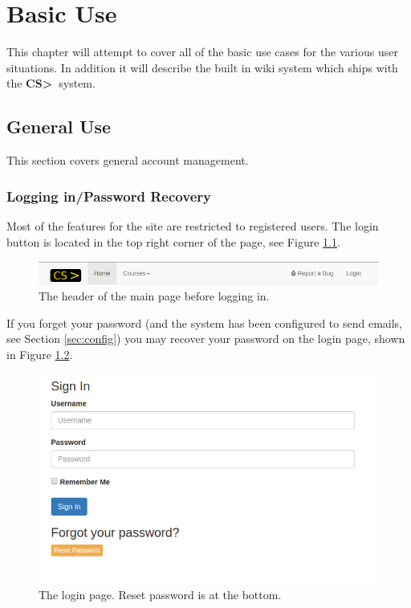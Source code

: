 \documentclass[11pt]{report}
\newcommand{\csgt}[0]{\textbf{CS\textgreater\ }}
\begin{document}
\chapter{Basic Use}
\label{ch:use}
This chapter will attempt to cover all of the basic use cases for the various user situations.
In addition it will describe the built in wiki system which ships with the \csgt system.

\section{General Use}
This section covers general account management.
\subsection{Logging in/Password Recovery}
Most of the features for the site are restricted to registered users. The login button is located in the 
top right corner of the page, see Figure \ref{fig:main_page}. 

\begin{figure}
\centering
\includegraphics[width=\textwidth,height=\textheight,keepaspectratio]{diagrams/main_page}
\caption{The header of the main page before logging in.}
\label{fig:main_page}
\end{figure}

If you forget your password (and the system has been configured to send emails, see Section \ref{sec:config}) 
you may recover your password on the login page, shown in Figure \ref{fig:login_page}.

\begin{figure}
\centering
\includegraphics[width=\textwidth,height=\textheight,keepaspectratio]{diagrams/login_page}
\caption{The login page. Reset password is at the bottom.}
\label{fig:login_page}
\end{figure}
\end{document}
